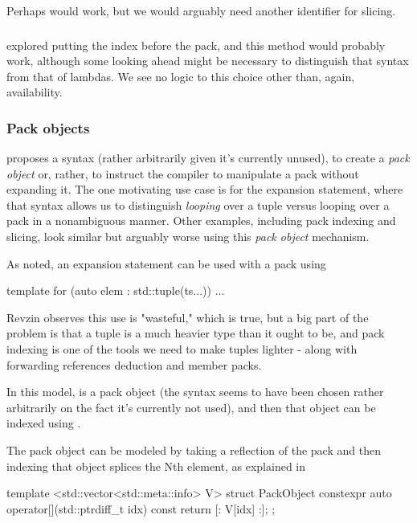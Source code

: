 \documentclass{wg21}
\begin{document}
Perhaps  would work, but we would arguably need another identifier for slicing.

\subsubsection{}

 explored putting the index before the pack, and this method
would probably work, although some looking ahead might be necessary to distinguish that syntax from that of lambdas.
We see no logic to this choice other than, again, availability.

\subsubsection{Pack objects}

 proposes a syntax (rather arbitrarily given it's currently unused), to create a \textit{pack object} or, rather, to instruct the compiler to manipulate
a pack without expanding it.
The one motivating use case is for the expansion statement, where that syntax allows us to distinguish \textit{looping} over a tuple versus looping over a pack in a nonambiguous manner.
Other examples, including pack indexing and slicing, look similar but arguably worse using this \textit{pack object} mechanism.

As noted, an expansion statement can be used with a pack using

\begin{colorblock}
    template for (auto elem : std::tuple(ts...)) { ... }
\end{colorblock}

Revzin observes this use is "wasteful," which is true, but a big part of the problem is that a tuple is a much heavier type than it ought to be,
and pack indexing is one of the tools we need to make tuples lighter - along with forwarding references deduction and member packs.

In this model,  is a pack object (the syntax seems to have been chosen rather arbitrarily on the fact it's currently not used),
and then that object can be indexed using .

The pack object can be modeled by taking a reflection of the pack and then indexing that object splices the Nth element, as explained in 

\begin{colorblock}
template <std::vector<std::meta::info> V>
struct PackObject {
    constexpr auto operator[](std::ptrdiff_t idx) const {
        return [: V[idx] :];
    }
};
\end{colorblock}
\end{document}
